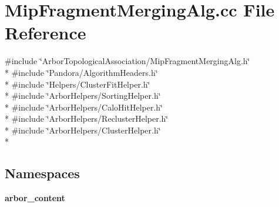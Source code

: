 \section{Mip\+Fragment\+Merging\+Alg.\+cc File Reference}
\label{MipFragmentMergingAlg_8cc}
{\ttfamily \#include \char`\"{}Arbor\+Topological\+Association/\+Mip\+Fragment\+Merging\+Alg.\+h\char`\"{}}\\*
{\ttfamily \#include \char`\"{}Pandora/\+Algorithm\+Headers.\+h\char`\"{}}\\*
{\ttfamily \#include \char`\"{}Helpers/\+Cluster\+Fit\+Helper.\+h\char`\"{}}\\*
{\ttfamily \#include \char`\"{}Arbor\+Helpers/\+Sorting\+Helper.\+h\char`\"{}}\\*
{\ttfamily \#include \char`\"{}Arbor\+Helpers/\+Calo\+Hit\+Helper.\+h\char`\"{}}\\*
{\ttfamily \#include \char`\"{}Arbor\+Helpers/\+Recluster\+Helper.\+h\char`\"{}}\\*
{\ttfamily \#include \char`\"{}Arbor\+Helpers/\+Cluster\+Helper.\+h\char`\"{}}\\*
\subsection*{Namespaces}
\begin{DoxyCompactItemize}
\item 
 {\bf arbor\+\_\+content}
\end{DoxyCompactItemize}
